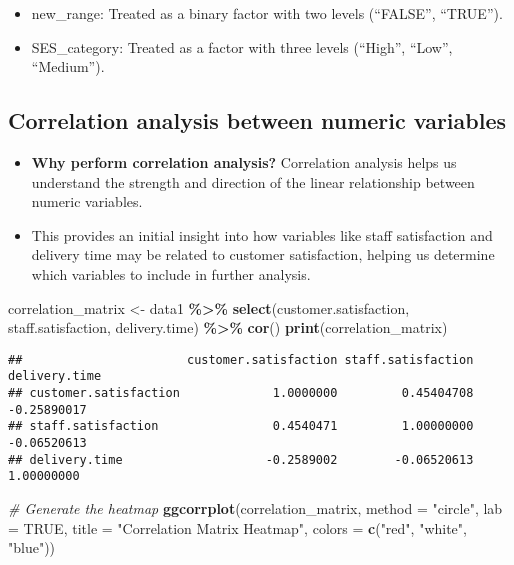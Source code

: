 \documentclass[
]{article}
\newenvironment{Shaded}{\begin{snugshade}}{\end{snugshade}}
\newcommand{\AttributeTok}[1]{\textcolor[rgb]{0.13,0.29,0.53}{#1}}
\newcommand{\CommentTok}[1]{\textcolor[rgb]{0.56,0.35,0.01}{\textit{#1}}}
\newcommand{\ConstantTok}[1]{\textcolor[rgb]{0.56,0.35,0.01}{#1}}
\newcommand{\FunctionTok}[1]{\textcolor[rgb]{0.13,0.29,0.53}{\textbf{#1}}}
\newcommand{\NormalTok}[1]{#1}
\newcommand{\OtherTok}[1]{\textcolor[rgb]{0.56,0.35,0.01}{#1}}
\newcommand{\SpecialCharTok}[1]{\textcolor[rgb]{0.81,0.36,0.00}{\textbf{#1}}}
\newcommand{\StringTok}[1]{\textcolor[rgb]{0.31,0.60,0.02}{#1}}
\providecommand{\tightlist}{%
  \setlength{\itemsep}{0pt}\setlength{\parskip}{0pt}}
\begin{document}
\begin{itemize}
\tightlist
\item
  new\_range: Treated as a binary factor with two levels (``FALSE'',
  ``TRUE'').
\item
  SES\_category: Treated as a factor with three levels (``High'',
  ``Low'', ``Medium'').
\end{itemize}

\subsection{Correlation analysis between numeric
variables}\label{correlation-analysis-between-numeric-variables}

\begin{itemize}
\tightlist
\item
  \textbf{Why perform correlation analysis?} Correlation analysis helps
  us understand the strength and direction of the linear relationship
  between numeric variables.
\item
  This provides an initial insight into how variables like staff
  satisfaction and delivery time may be related to customer
  satisfaction, helping us determine which variables to include in
  further analysis.
\end{itemize}

\begin{Shaded}
\begin{Highlighting}[]
\NormalTok{correlation\_matrix }\OtherTok{\textless{}{-}}\NormalTok{ data1 }\SpecialCharTok{\%\textgreater{}\%} 
  \FunctionTok{select}\NormalTok{(customer.satisfaction, staff.satisfaction, delivery.time) }\SpecialCharTok{\%\textgreater{}\%} 
  \FunctionTok{cor}\NormalTok{()}
\FunctionTok{print}\NormalTok{(correlation\_matrix)}
\end{Highlighting}
\end{Shaded}

\begin{verbatim}
##                       customer.satisfaction staff.satisfaction delivery.time
## customer.satisfaction             1.0000000         0.45404708   -0.25890017
## staff.satisfaction                0.4540471         1.00000000   -0.06520613
## delivery.time                    -0.2589002        -0.06520613    1.00000000
\end{verbatim}

\begin{Shaded}
\begin{Highlighting}[]
\CommentTok{\# Generate the heatmap}
\FunctionTok{ggcorrplot}\NormalTok{(correlation\_matrix, }
           \AttributeTok{method =} \StringTok{"circle"}\NormalTok{, }
           \AttributeTok{lab =} \ConstantTok{TRUE}\NormalTok{, }
           \AttributeTok{title =} \StringTok{"Correlation Matrix Heatmap"}\NormalTok{,}
           \AttributeTok{colors =} \FunctionTok{c}\NormalTok{(}\StringTok{"red"}\NormalTok{, }\StringTok{"white"}\NormalTok{, }\StringTok{"blue"}\NormalTok{))}
\end{Highlighting}
\end{Shaded}
\end{document}
